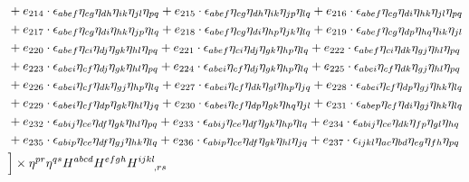 \begin{itemize}
{\begin{minipage}[t]{\linewidth}
\begin{align}
    & + e_{214} \cdot \epsilon_{a b e f} \eta_{c g} \eta_{d h} \eta_{i k} \eta_{j l} \eta_{p q} + e_{215} \cdot \epsilon_{a b e f} \eta_{c g} \eta_{d h} \eta_{i k} \eta_{j p} \eta_{l q} + e_{216} \cdot \epsilon_{a b e f} \eta_{c g} \eta_{d i} \eta_{h k} \eta_{j l} \eta_{p q} \nonumber \\
    & + e_{217} \cdot \epsilon_{a b e f} \eta_{c g} \eta_{d i} \eta_{h k} \eta_{j p} \eta_{l q} + e_{218} \cdot \epsilon_{a b e f} \eta_{c g} \eta_{d i} \eta_{h p} \eta_{j k} \eta_{l q} + e_{219} \cdot \epsilon_{a b e f} \eta_{c g} \eta_{d p} \eta_{h q} \eta_{i k} \eta_{j l} \nonumber \\
    & + e_{220} \cdot \epsilon_{a b e f} \eta_{c i} \eta_{d j} \eta_{g k} \eta_{h l} \eta_{p q} + e_{221} \cdot \epsilon_{a b e f} \eta_{c i} \eta_{d j} \eta_{g k} \eta_{h p} \eta_{l q} + e_{222} \cdot \epsilon_{a b e f} \eta_{c i} \eta_{d k} \eta_{g j} \eta_{h l} \eta_{p q} \nonumber \\
    & + e_{223} \cdot \epsilon_{a b e i} \eta_{c f} \eta_{d j} \eta_{g k} \eta_{h l} \eta_{p q} + e_{224} \cdot \epsilon_{a b e i} \eta_{c f} \eta_{d j} \eta_{g k} \eta_{h p} \eta_{l q} + e_{225} \cdot \epsilon_{a b e i} \eta_{c f} \eta_{d k} \eta_{g j} \eta_{h l} \eta_{p q} \nonumber \\
    & + e_{226} \cdot \epsilon_{a b e i} \eta_{c f} \eta_{d k} \eta_{g j} \eta_{h p} \eta_{l q} + e_{227} \cdot \epsilon_{a b e i} \eta_{c f} \eta_{d k} \eta_{g l} \eta_{h p} \eta_{j q} + e_{228} \cdot \epsilon_{a b e i} \eta_{c f} \eta_{d p} \eta_{g j} \eta_{h k} \eta_{l q} \nonumber \\
    & + e_{229} \cdot \epsilon_{a b e i} \eta_{c f} \eta_{d p} \eta_{g k} \eta_{h l} \eta_{j q} + e_{230} \cdot \epsilon_{a b e i} \eta_{c f} \eta_{d p} \eta_{g k} \eta_{h q} \eta_{j l} + e_{231} \cdot \epsilon_{a b e p} \eta_{c f} \eta_{d i} \eta_{g j} \eta_{h k} \eta_{l q} \nonumber \\
    & + e_{232} \cdot \epsilon_{a b i j} \eta_{c e} \eta_{d f} \eta_{g k} \eta_{h l} \eta_{p q} + e_{233} \cdot \epsilon_{a b i j} \eta_{c e} \eta_{d f} \eta_{g k} \eta_{h p} \eta_{l q} + e_{234} \cdot \epsilon_{a b i j} \eta_{c e} \eta_{d k} \eta_{f p} \eta_{g l} \eta_{h q} \nonumber \\
    & + e_{235} \cdot \epsilon_{a b i p} \eta_{c e} \eta_{d f} \eta_{g j} \eta_{h k} \eta_{l q} + e_{236} \cdot \epsilon_{a b i p} \eta_{c e} \eta_{d f} \eta_{g k} \eta_{h l} \eta_{j q} + e_{237} \cdot \epsilon_{i j k l} \eta_{a c} \eta_{b d} \eta_{e g} \eta_{f h} \eta_{p q} \nonumber \\
    & \Big\rbrack \times \eta^{pr} \eta^{qs} H^{abcd} H^{efgh} H^{ijkl}_{\hphantom{ijkl},rs}
\end{align}
\end{minipage}}
\end{itemize}

